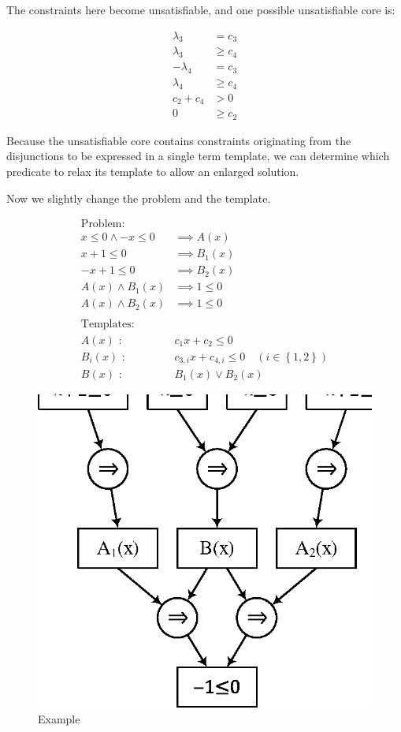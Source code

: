 The constraints here become unsatisfiable, and one possible
unsatisfiable core is:

\begin{align*}
\lambda_3 & = c_3 \\
\lambda_3 & \geq c_4 \\
- \lambda_4 & = c_3 \\
\lambda_4 & \geq c_4 \\
c_2 + c_4 & > 0 \\
0 & \geq c_2
\end{align*}

Because the unsatisfiable core contains constraints originating from
the disjunctions to be expressed in a single term template, we can
determine which predicate to relax its template to allow an enlarged solution.

Now we slightly change the problem and the template.

\begin{align*}
\text{Problem:} \\
x \leq 0 \wedge -x \leq 0 & \implies A(x) \\
x+1 \leq 0 & \implies B_1(x) \\
-x+1 \leq 0 & \implies B_2(x) \\
A(x) \wedge B_1(x) & \implies 1 \leq 0 \\
A(x) \wedge B_2(x) & \implies 1 \leq 0 \\
\\
\text{Templates:} \\
A(x) \text{ : } & c_1 x + c_2 \leq 0 \\
B_i(x) \text{ : } & c_{3,i} x + c_{4,i} \leq 0 \quad (i \in \left\lbrace 1,2 \right\rbrace ) \\
B(x) \text{ : } & B_1(x) \vee B_2(x)
\end{align*}

\begin{figure}
  \begin{center}
    \includegraphics[scale=1]{figures/ex3-2.eps}
  \end{center}
  \caption{Example}
\end{figure}

